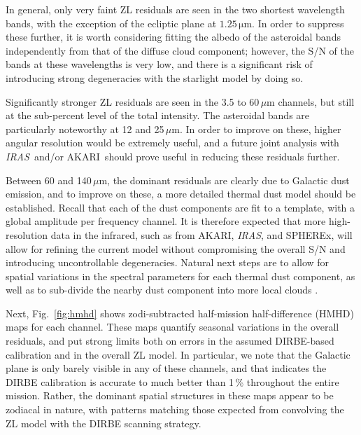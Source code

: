 \documentclass{aa}
\def\AKARI{\textrm{{AKARI}}}
\def\IRAS{\textit{{IRAS}}}
\begin{document}
In general, only very faint ZL residuals are seen in the two
shortest wavelength bands, {with the exception of the ecliptic plane at $1.25\,\mathrm{\mu m}$}. In order to suppress these further, it is
worth considering fitting the albedo of the asteroidal bands
independently from that of the diffuse cloud component; however, the S/N  of
the bands at these wavelengths is very low, and there is a significant
risk of introducing strong degeneracies with the starlight model by
doing so.

Significantly stronger ZL residuals are seen in the 3.5 to 60$\,\mu$m
channels, but still at the sub-percent level of the total
intensity. The asteroidal bands are particularly noteworthy at
12 and 25$\,\mu$m. In order to improve on these, higher angular resolution
would be extremely useful, and a future joint analysis with \IRAS\
and/or \AKARI\ should prove useful in reducing these residuals further.

Between 60 and 140$\,\mu$m, the dominant residuals are clearly due to
Galactic dust emission, and to improve on these, a more detailed
thermal dust model should be established. 
{Recall that each of the dust components are fit to a template, with a global amplitude per frequency channel. It is therefore expected that more high-resolution data in the infrared, such as from \AKARI, \IRAS, and SPHEREx, will allow
}
for refining the current
model without compromising the overall S/N and
introducing uncontrollable degeneracies. Natural next steps are to
allow for spatial variations in the spectral parameters for each
thermal dust component, as well as to sub-divide the nearby dust
component into more local clouds \citep{CG02_05,CG02_06,CG02_07}.

Next, Fig.~\ref{fig:hmhd} shows zodi-subtracted half-mission half-difference (HMHD)
maps for each channel. These maps quantify seasonal variations in the
overall residuals, and put strong limits both on errors in the assumed
DIRBE-based calibration and in the overall ZL model. In particular, we
note that the Galactic plane is only barely visible in any of these
channels, and that indicates the DIRBE calibration is accurate to much
better than 1\,\% throughout the entire mission. Rather, the dominant
spatial structures in these maps appear to be zodiacal in nature, with
patterns matching those expected from convolving the ZL model with the
DIRBE scanning strategy.
\end{document}
